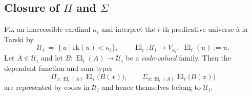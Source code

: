 \documentclass[a4paper,11pt]{article}
\newcommand{\El}{\operatorname{El}}          %
\begin{document}
\subsection{Closure of $\Pi$ and $\Sigma$}
\begin{lemma}\label{lem:closure-pi-sigma}
Fix an inaccessible cardinal $\kappa_{i}$ and interpret the $i$-th
predicative universe à la Tarski by
\[
  \mathcal U_{i}
    \;=\;
    \bigl\{\,u\mid \mathrm{rk}(u)<\kappa_{i}\bigr\},
  \qquad
  \El_{i}\colon \mathcal U_{i}\longrightarrow V_{\kappa_{i}},
  \;\El_{i}(u):=u .
\]
Let $A\in\mathcal U_{i}$ and let
$B\colon\El_{i}(A)\to\mathcal U_{i}$ be a \emph{code-valued} family.
Then the dependent function and sum types
\[
  \Pi_{x:\El_{i}(A)}\El_{i}\bigl(B(x)\bigr),
  \qquad
  \Sigma_{x:\El_{i}(A)}\El_{i}\bigl(B(x)\bigr)
\]
are represented by codes in\/ $\mathcal U_{i}$ and hence themselves
belong to\/ $\mathcal U_{i}$.
\end{lemma}
\end{document}

